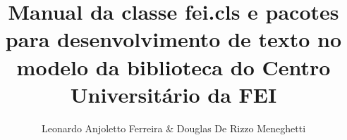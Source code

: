 \documentclass{fei}
\begin{document}
\author{Leonardo Anjoletto Ferreira \& Douglas De Rizzo Meneghetti}
\title{Manual da classe fei.cls e pacotes para desenvolvimento de texto no modelo da biblioteca do Centro Universitário da FEI}

\maketitle
\sumario





\bibliografia{}
\end{document}
